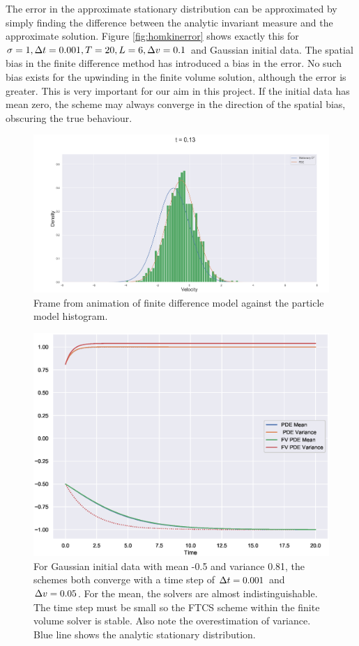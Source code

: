      The error in the approximate stationary distribution can be approximated by simply finding the difference between the analytic invariant measure and the approximate solution. Figure \ref{fig:homkinerror} shows exactly this for $\sigma = 1, \Delta t = 0.001, T = 20, L=6, \Delta v = 0.1$ and Gaussian initial data. The spatial bias in the finite difference method has introduced a bias in the error. No such bias exists for the upwinding in the finite volume solution, although the error is greater. This is very important for our aim in this project. If the initial data has mean zero, the scheme may always converge in the direction of the spatial bias, obscuring the true behaviour. 
     \begin{figure}
        \centering
        \includegraphics[width=\linewidth]{Figures/homPDEparticle}
        \caption[Comparing PDE to Particle Density]{Frame from animation of finite difference model against the particle model histogram.}
        \label{fig:homPDEparticle}
    \end{figure}
    \begin{figure}
        \centering
        \includegraphics[width=0.8\linewidth]{Figures/kinmodelmomvar}
        \caption[Convergence of Moments for Kinetic Model]{For Gaussian initial data with mean -0.5 and variance 0.81, the schemes both converge with a time step of $\Delta t =0.001$ and $\Delta v = 0.05$. For the mean, the solvers are almost indistinguishable. The time step must be small so the FTCS scheme within the finite volume solver is stable. Also note the overestimation of variance. Blue line shows the analytic stationary distribution.}
        \label{fig:kinmodelmomvar}
    \end{figure}

